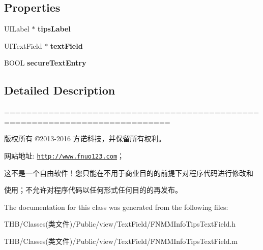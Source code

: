 \subsection*{Properties}
\begin{DoxyCompactItemize}
\item 
\mbox{\label{interface_f_n_m_m_info_tips_text_field_ad6b0363b55cc227cd76c4b95dd62085e}} 
U\+I\+Label $\ast$ {\bfseries tips\+Label}
\item 
\mbox{\label{interface_f_n_m_m_info_tips_text_field_a8c56b3456e5c4355d0ab81bba4c4a79e}} 
U\+I\+Text\+Field $\ast$ {\bfseries text\+Field}
\item 
\mbox{\label{interface_f_n_m_m_info_tips_text_field_adf72782733895fecb7b05e8532424ce2}} 
B\+O\+OL {\bfseries secure\+Text\+Entry}
\end{DoxyCompactItemize}


\subsection{Detailed Description}
============================================================================

版权所有 ©2013-\/2016 方诺科技，并保留所有权利。

网站地址\+: \href{http://www.fnuo123.com}{\tt http\+://www.\+fnuo123.\+com}； 



这不是一个自由软件！您只能在不用于商业目的的前提下对程序代码进行修改和

使用；不允许对程序代码以任何形式任何目的的再发布。 

 

The documentation for this class was generated from the following files\+:\begin{DoxyCompactItemize}
\item 
T\+H\+B/\+Classes(类文件)/\+Public/view/\+Text\+Field/F\+N\+M\+M\+Info\+Tips\+Text\+Field.\+h\item 
T\+H\+B/\+Classes(类文件)/\+Public/view/\+Text\+Field/F\+N\+M\+M\+Info\+Tips\+Text\+Field.\+m\end{DoxyCompactItemize}
